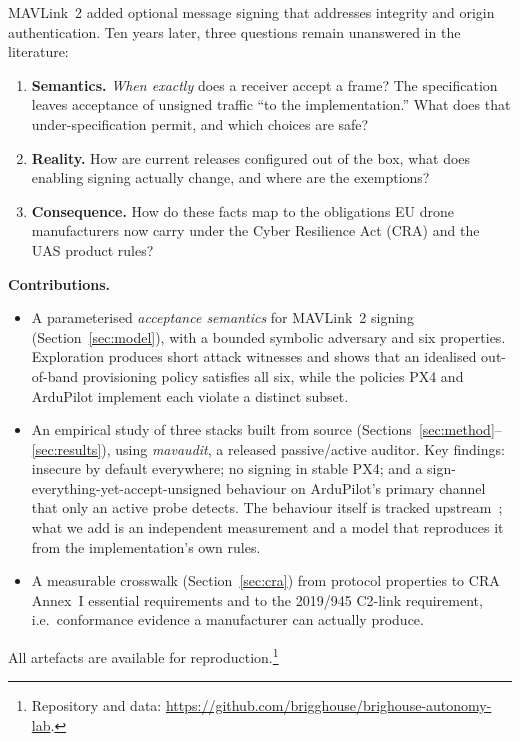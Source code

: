 \documentclass[conference]{IEEEtran}
\begin{document}
MAVLink~2 added optional message signing that addresses integrity and origin
authentication. Ten years later, three questions remain unanswered in the
literature:

\begin{enumerate}
\item \textbf{Semantics.} \emph{When exactly} does a receiver accept a frame?
The specification leaves acceptance of unsigned traffic ``to the
implementation.'' What does that under-specification permit, and which choices
are safe?
\item \textbf{Reality.} How are current releases configured out of the box,
what does enabling signing actually change, and where are the exemptions?
\item \textbf{Consequence.} How do these facts map to the obligations EU drone
manufacturers now carry under the Cyber Resilience Act (CRA) and the UAS
product rules?
\end{enumerate}

\noindent\textbf{Contributions.}
\begin{itemize}
\item A parameterised \emph{acceptance semantics} for MAVLink~2 signing
(Section~\ref{sec:model}), with a bounded symbolic adversary and six properties.
Exploration produces short attack witnesses and shows that an idealised
out-of-band provisioning policy satisfies all six, while the policies PX4 and
ArduPilot implement each violate a distinct subset.
\item An empirical study of three stacks built from source
(Sections~\ref{sec:method}--\ref{sec:results}), using \emph{mavaudit}, a
released passive/active auditor. Key findings: insecure by default everywhere;
no signing in stable PX4; and a sign-everything-yet-accept-unsigned behaviour on
ArduPilot's primary channel that only an active probe detects. The behaviour
itself is tracked upstream~\cite{ardupilot_issue34489,ardupilot_pr34780}; what
we add is an independent measurement and a model that reproduces it from the
implementation's own rules.
\item A measurable crosswalk (Section~\ref{sec:cra}) from protocol properties to
CRA Annex~I essential requirements and to the 2019/945 C2-link requirement, i.e.\
conformance evidence a manufacturer can actually produce.
\end{itemize}

All artefacts are available for reproduction.\footnote{Repository and data:
\url{https://github.com/brigghouse/brighouse-autonomy-lab}.}
\end{document}
